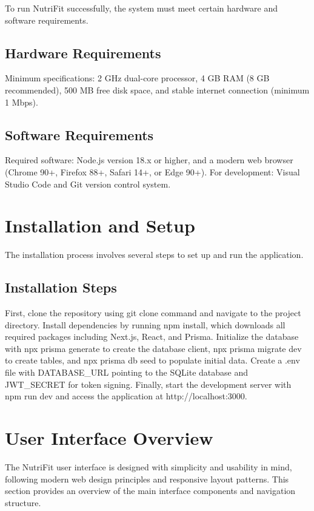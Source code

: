 To run NutriFit successfully, the system must meet certain hardware and software requirements.

\subsection{Hardware Requirements}

Minimum specifications: 2 GHz dual-core processor, 4 GB RAM (8 GB recommended), 500 MB free disk space, and stable internet connection (minimum 1 Mbps).

\subsection{Software Requirements}

Required software: Node.js version 18.x or higher, and a modern web browser (Chrome 90+, Firefox 88+, Safari 14+, or Edge 90+). For development: Visual Studio Code and Git version control system.

\section{Installation and Setup}

The installation process involves several steps to set up and run the application.

\subsection{Installation Steps}

First, clone the repository using git clone command and navigate to the project directory. Install dependencies by running npm install, which downloads all required packages including Next.js, React, and Prisma. Initialize the database with npx prisma generate to create the database client, npx prisma migrate dev to create tables, and npx prisma db seed to populate initial data. Create a .env file with DATABASE\_URL pointing to the SQLite database and JWT\_SECRET for token signing. Finally, start the development server with npm run dev and access the application at http://localhost:3000.

\section{User Interface Overview}

The NutriFit user interface is designed with simplicity and usability in mind, following modern web design principles and responsive layout patterns. This section provides an overview of the main interface components and navigation structure.

